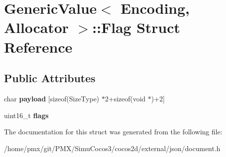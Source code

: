 \hypertarget{structGenericValue_1_1Flag}{}\section{Generic\+Value$<$ Encoding, Allocator $>$\+:\+:Flag Struct Reference}
\label{structGenericValue_1_1Flag}
\subsection*{Public Attributes}
\begin{DoxyCompactItemize}
\item 
\mbox{\label{structGenericValue_1_1Flag_aced7ede2056a797fb80817d45634e3ea}} 
char {\bfseries payload} \mbox{[}sizeof(Size\+Type) $\ast$2+sizeof(void $\ast$)+2\mbox{]}
\item 
\mbox{\label{structGenericValue_1_1Flag_ac91f08067dcc0003fc78e870ca9b2d5d}} 
uint16\+\_\+t {\bfseries flags}
\end{DoxyCompactItemize}


The documentation for this struct was generated from the following file\+:\begin{DoxyCompactItemize}
\item 
/home/pmx/git/\+P\+M\+X/\+Simu\+Cocos3/cocos2d/external/json/document.\+h\end{DoxyCompactItemize}
